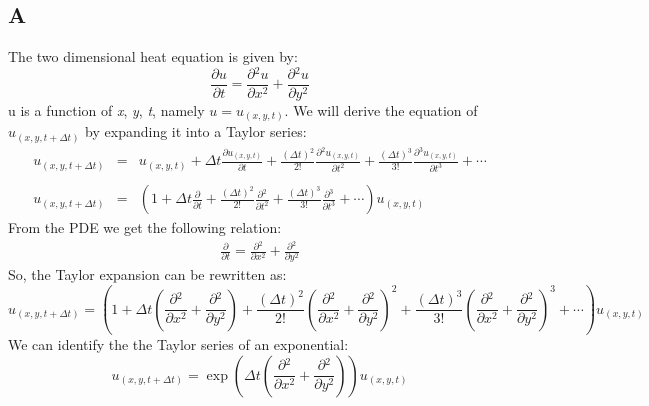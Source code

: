 \documentclass[11pt, a4paper]{article}
\newcommand{\parder}[2]{\frac{\partial {#1}}{\partial {#2}}}
\begin{document}
\subsection{A}
The two dimensional heat equation is given by:
\begin{equation}
    \parder{u}{t}=\parder{^2u}{x^2}+\parder{^2u}{y^2}
\end{equation}
u is a function of \emph{x}, \emph{y}, \emph{t}, namely $u=u_{\left(x,y,t\right)}$. We will derive the equation of $u_{\left(x,y,t+\Delta t\right)}$ by expanding it into a Taylor series:
\begin{equation}
    \begin{array}{rcl}
        \displaystyle u_{\left(x,y,t+\Delta t\right)} & = & \displaystyle u_{\left(x,y,t\right)}+\Delta t\parder{u_{\left(x,y,t\right)}}{t}+\frac{\left(\Delta t\right)^2}{2!}\parder{^2u_{\left(x,y,t\right)}}{t^2} +\frac{\left(\Delta t\right)^3}{3!}\parder{^3u_{\left(x,y,t\right)}}{t^3}+\cdots \\\\
        \displaystyle u_{\left(x,y,t+\Delta t\right)} & = & \displaystyle \left(1+\Delta t\parder{}{t}+\frac{\left(\Delta t\right)^2}{2!}\parder{^2}{t^2} +\frac{\left(\Delta t\right)^3}{3!}\parder{^3}{t^3}+\cdots\right)u_{\left(x,y,t\right)}
    \end{array}
\end{equation}
From the PDE we get the following relation:
\begin{equation}
    \begin{matrix}
        \displaystyle \parder{}{t}=\parder{^2}{x^2}+\parder{^2}{y^2}
    \end{matrix}
\end{equation}
So, the Taylor expansion can be rewritten as:
\begin{equation}
    \displaystyle u_{\left(x,y,t+\Delta t\right)}=\displaystyle \left(1+\Delta t\left(\parder{^2}{x^2}+\parder{^2}{y^2}\right)+\frac{\left(\Delta t\right)^2}{2!}\left(\parder{^2}{x^2}+\parder{^2}{y^2}\right)^2 +\frac{\left(\Delta t\right)^3}{3!}\left(\parder{^2}{x^2}+\parder{^2}{y^2}\right)^3+\cdots\right)u_{\left(x,y,t\right)}
\end{equation}
We can identify the the Taylor series of an exponential:
\begin{equation}
    \displaystyle u_{\left(x,y,t+\Delta t\right)}=\exp{\left(\Delta t\left(\parder{^2}{x^2}+\parder{^2}{y^2}\right)\right)}u_{\left(x,y,t\right)}
    \label{eq: converting to exponential}
\end{equation}
\end{document}
